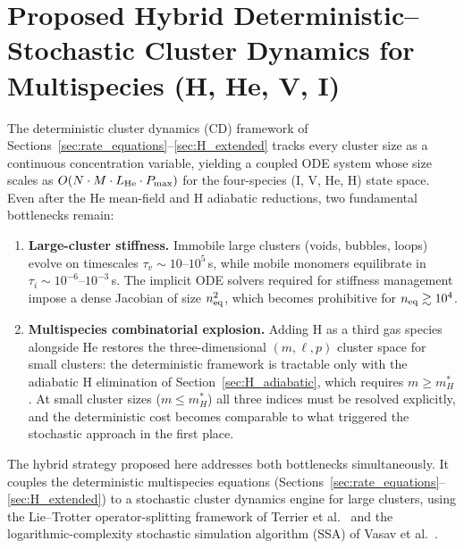 \section{Proposed Hybrid Deterministic--Stochastic Cluster Dynamics
         for Multispecies (H, He, V, I)}
\label{sec:hybrid}

The deterministic cluster dynamics (CD) framework of
Sections~\ref{sec:rate_equations}--\ref{sec:H_extended} tracks
every cluster size as a continuous concentration variable, yielding a
coupled ODE system whose size scales as $O(N \cdot M \cdot L_{\rm He}
\cdot P_{\max})$ for the four-species (I, V, He, H) state space.
Even after the He mean-field and H adiabatic reductions, two
fundamental bottlenecks remain:
\begin{enumerate}
  \item \textbf{Large-cluster stiffness.} Immobile large clusters
        (voids, bubbles, loops) evolve on timescales $\tau_v \sim
        10$--$10^5$\,s, while mobile monomers equilibrate in
        $\tau_i \sim 10^{-6}$--$10^{-3}$\,s. The implicit ODE solvers
        required for stiffness management impose a dense Jacobian of
        size $n_{\rm eq}^2$, which becomes prohibitive for
        $n_{\rm eq} \gtrsim 10^4$.
  \item \textbf{Multispecies combinatorial explosion.} Adding H as a
        third gas species alongside He restores the three-dimensional
        $(m,\ell,p)$ cluster space for small clusters: the deterministic
        framework is tractable only with the adiabatic H elimination of
        Section~\ref{sec:H_adiabatic}, which requires $m \geq m_H^*$.
        At small cluster sizes ($m \leq m_H^*$) all three indices must
        be resolved explicitly, and the deterministic cost becomes
        comparable to what triggered the stochastic approach in the
        first place.
\end{enumerate}

The hybrid strategy proposed here addresses both bottlenecks
simultaneously.  It couples the deterministic multispecies equations
(Sections~\ref{sec:rate_equations}--\ref{sec:H_extended}) to a
stochastic cluster dynamics engine for large clusters, using the
Lie--Trotter operator-splitting framework of Terrier
et al.~\cite{Terrier2017} and the logarithmic-complexity
stochastic simulation algorithm (SSA) of Vasav
et al.~\cite{Vasav2026}.

